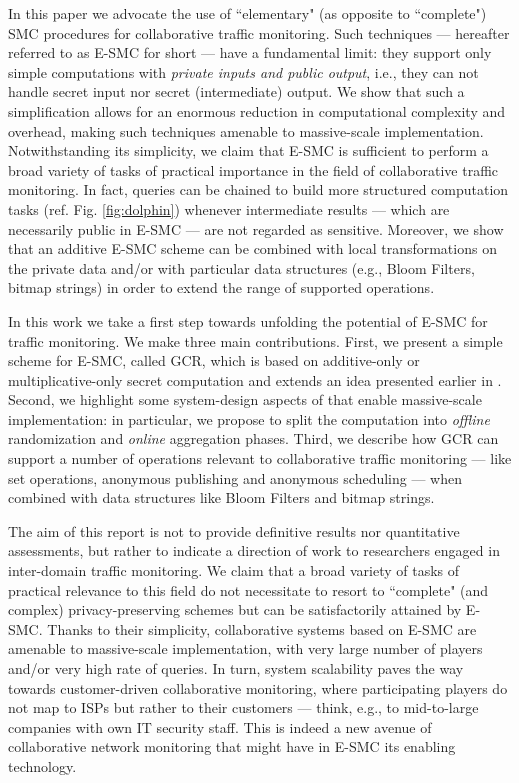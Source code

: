 \documentclass{sig-alternate}
\begin{document}
In this paper we advocate the use of ``elementary" (as opposite to ``complete") SMC procedures for collaborative traffic monitoring.
Such techniques --- hereafter referred to as E-SMC for short --- have a fundamental limit: they support only simple computations with {\em private inputs and public output}, i.e., they can not handle secret input nor secret (intermediate) output. 
We show that such a simplification allows for an enormous reduction in computational complexity and overhead, making such techniques amenable to massive-scale implementation. Notwithstanding its simplicity, we claim that E-SMC is sufficient to perform a broad variety of tasks of practical importance in the field of collaborative traffic monitoring.
In fact, queries  can be chained to build more structured computation tasks (ref. Fig. \ref{fig:dolphin})
whenever intermediate results  --- which are necessarily public in E-SMC --- are not regarded as sensitive. 
Moreover, we show that an additive E-SMC scheme can be combined with local transformations on the private data and/or with particular data structures (e.g., Bloom Filters, bitmap strings) 
in order to extend the range of supported operations. 
  
In this work we take a first step towards unfolding the potential of E-SMC for traffic monitoring. We make three main contributions.
First, we present a simple scheme for E-SMC, called GCR, which is based on additive-only or multiplicative-only secret computation and extends an idea presented earlier in \cite{Atallah04}.
Second, we highlight some system-design aspects of \ata that enable massive-scale implementation: in particular, we propose to split the computation into 
 {\em offline} randomization and {\em online} aggregation phases.
Third, we describe how  GCR can support a number of operations relevant to collaborative traffic monitoring --- like set operations, anonymous publishing and anonymous scheduling --- when combined with data structures like Bloom Filters and bitmap strings. 

The aim of this report is not to provide definitive results nor quantitative assessments, but rather to indicate a direction of work to researchers engaged in inter-domain traffic monitoring.
We claim that a broad variety of tasks  of practical relevance to this field do not necessitate to resort to  ``complete" (and complex) privacy-preserving schemes but can be satisfactorily attained by E-SMC. Thanks to their simplicity, collaborative systems based on E-SMC are amenable to massive-scale implementation, with very large number of players and/or very high rate of queries. In turn, system scalability paves the way towards  customer-driven collaborative monitoring, where participating players do not map to ISPs but rather to their customers --- think, e.g., to mid-to-large companies with own IT security staff. 
 This is indeed a new avenue of collaborative network monitoring that might have in E-SMC its enabling technology.
\end{document}
